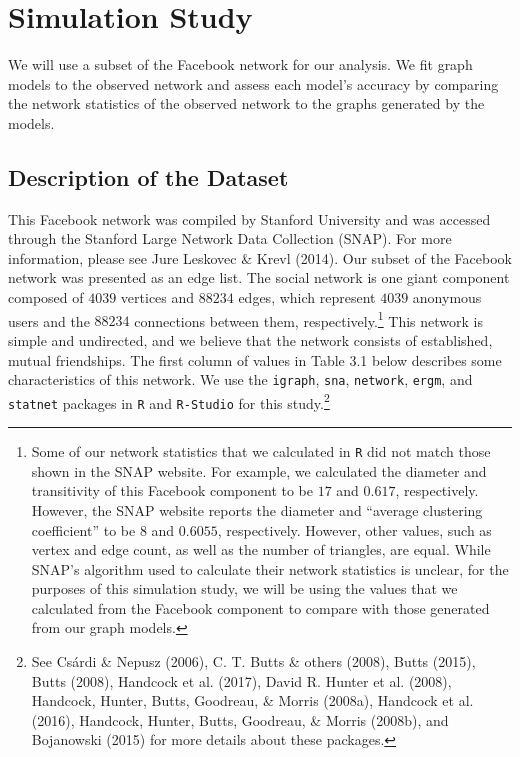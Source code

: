 \documentclass[12pt,twoside]{amherstthesis}
\begin{document}
  \chapter{Simulation Study}\label{simulation-study}
  
  We will use a subset of the Facebook network for our analysis. We fit
  graph models to the observed network and assess each model's accuracy by
  comparing the network statistics of the observed network to the graphs
  generated by the models.
  
  \section{Description of the Dataset}\label{description-of-the-dataset}
  
  This Facebook network was compiled by Stanford University and was
  accessed through the Stanford Large Network Data Collection (SNAP). For
  more information, please see Jure Leskovec \& Krevl (2014). Our subset
  of the Facebook network was presented as an edge list. The social
  network is one giant component composed of \(4039\) vertices and
  \(88234\) edges, which represent \(4039\) anonymous users and the
  \(88234\) connections between them, respectively.\footnote{Some of our
    network statistics that we calculated in \texttt{R} did not match
    those shown in the SNAP website. For example, we calculated the
    diameter and transitivity of this Facebook component to be \(17\) and
    \(0.617\), respectively. However, the SNAP website reports the
    diameter and ``average clustering coefficient'' to be \(8\) and
    \(0.6055\), respectively. However, other values, such as vertex and
    edge count, as well as the number of triangles, are equal. While
    SNAP's algorithm used to calculate their network statistics is
    unclear, for the purposes of this simulation study, we will be using
    the values that we calculated from the Facebook component to compare
    with those generated from our graph models.} This network is simple
  and undirected, and we believe that the network consists of established,
  mutual friendships. The first column of values in Table 3.1 below
  describes some characteristics of this network. We use the
  \texttt{igraph}, \texttt{sna}, \texttt{network}, \texttt{ergm}, and
  \texttt{statnet} packages in \texttt{R} and \texttt{R-Studio} for this
  study.\footnote{See Csárdi \& Nepusz (2006), C. T. Butts \& others
    (2008), Butts (2015), Butts (2008), Handcock et al. (2017), David R.
    Hunter et al. (2008), Handcock, Hunter, Butts, Goodreau, \& Morris
    (2008a), Handcock et al. (2016), Handcock, Hunter, Butts, Goodreau, \&
    Morris (2008b), and Bojanowski (2015) for more details about these
    packages.}
  
\end{document}
